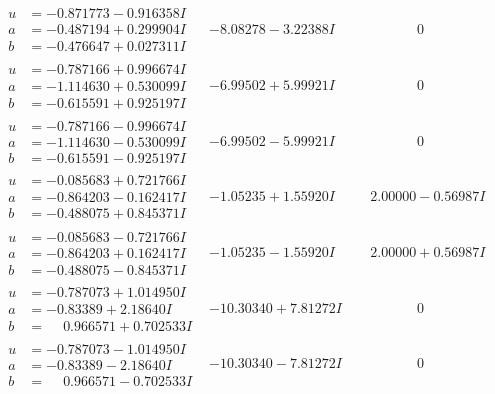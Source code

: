 \documentclass[1p]{elsarticle_modified}
\theoremstyle{definition}
\begin{document}
$$\begin{array}{c|c|c}
\begin{aligned}
u &= -0.871773 - 0.916358 I \\
a &= -0.487194 + 0.299904 I \\
b &= -0.476647 + 0.027311 I\end{aligned}
 & -8.08278 - 3.22388 I & \phantom{-0.000000 } 0 \\ \hline\begin{aligned}
u &= -0.787166 + 0.996674 I \\
a &= -1.114630 + 0.530099 I \\
b &= -0.615591 + 0.925197 I\end{aligned}
 & -6.99502 + 5.99921 I & \phantom{-0.000000 } 0 \\ \hline\begin{aligned}
u &= -0.787166 - 0.996674 I \\
a &= -1.114630 - 0.530099 I \\
b &= -0.615591 - 0.925197 I\end{aligned}
 & -6.99502 - 5.99921 I & \phantom{-0.000000 } 0 \\ \hline\begin{aligned}
u &= -0.085683 + 0.721766 I \\
a &= -0.864203 - 0.162417 I \\
b &= -0.488075 + 0.845371 I\end{aligned}
 & -1.05235 + 1.55920 I & \phantom{-}2.00000 - 0.56987 I \\ \hline\begin{aligned}
u &= -0.085683 - 0.721766 I \\
a &= -0.864203 + 0.162417 I \\
b &= -0.488075 - 0.845371 I\end{aligned}
 & -1.05235 - 1.55920 I & \phantom{-}2.00000 + 0.56987 I \\ \hline\begin{aligned}
u &= -0.787073 + 1.014950 I \\
a &= -0.83389 + 2.18640 I \\
b &= \phantom{-}0.966571 + 0.702533 I\end{aligned}
 & -10.30340 + 7.81272 I & \phantom{-0.000000 } 0 \\ \hline\begin{aligned}
u &= -0.787073 - 1.014950 I \\
a &= -0.83389 - 2.18640 I \\
b &= \phantom{-}0.966571 - 0.702533 I\end{aligned}
 & -10.30340 - 7.81272 I & \phantom{-0.000000 } 0 \\ \hline\begin{aligned}

\end{aligned}
\end{array}$$
\end{document}
